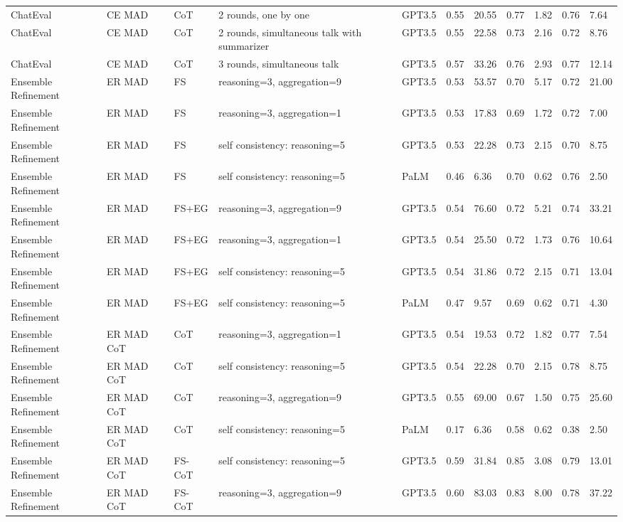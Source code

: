 \begin{landscape}
\begin{longtable}{lllllllllll}
ChatEval & CE MAD & CoT & 2 rounds, one by one & GPT3.5 & 0.55 & 20.55 & 0.77 & 1.82 & 0.76 & 7.64 \\
ChatEval & CE MAD & CoT & 2 rounds, simultaneous talk with summarizer & GPT3.5 & 0.55 & 22.58 & 0.73 & 2.16 & 0.72 & 8.76 \\
ChatEval & CE MAD & CoT & 3 rounds, simultaneous talk & GPT3.5 & 0.57 & 33.26 & 0.76 & 2.93 & 0.77 & 12.14 \\
Ensemble Refinement & ER MAD & FS & reasoning=3, aggregation=9 & GPT3.5 & 0.53 & 53.57 & 0.70 & 5.17 & 0.72 & 21.00 \\
Ensemble Refinement & ER MAD & FS & reasoning=3, aggregation=1 & GPT3.5 & 0.53 & 17.83 & 0.69 & 1.72 & 0.72 & 7.00 \\
Ensemble Refinement & ER MAD & FS & self consistency: reasoning=5 & GPT3.5 & 0.53 & 22.28 & 0.73 & 2.15 & 0.70 & 8.75 \\
Ensemble Refinement & ER MAD & FS & self consistency: reasoning=5 & PaLM & 0.46 & 6.36 & 0.70 & 0.62 & 0.76 & 2.50 \\
Ensemble Refinement & ER MAD & FS+EG & reasoning=3, aggregation=9 & GPT3.5 & 0.54 & 76.60 & 0.72 & 5.21 & 0.74 & 33.21 \\
Ensemble Refinement & ER MAD & FS+EG & reasoning=3, aggregation=1 & GPT3.5 & 0.54 & 25.50 & 0.72 & 1.73 & 0.76 & 10.64 \\
Ensemble Refinement & ER MAD & FS+EG & self consistency: reasoning=5 & GPT3.5 & 0.54 & 31.86 & 0.72 & 2.15 & 0.71 & 13.04 \\
Ensemble Refinement & ER MAD & FS+EG & self consistency: reasoning=5 & PaLM & 0.47 & 9.57 & 0.69 & 0.62 & 0.71 & 4.30 \\
Ensemble Refinement & ER MAD CoT & CoT & reasoning=3, aggregation=1 & GPT3.5 & 0.54 & 19.53 & 0.72 & 1.82 & 0.77 & 7.54 \\
Ensemble Refinement & ER MAD CoT & CoT & self consistency: reasoning=5 & GPT3.5 & 0.54 & 22.28 & 0.70 & 2.15 & 0.78 & 8.75 \\
Ensemble Refinement & ER MAD CoT & CoT & reasoning=3, aggregation=9 & GPT3.5 & 0.55 & 69.00 & 0.67 & 1.50 & 0.75 & 25.60 \\
Ensemble Refinement & ER MAD CoT & CoT & self consistency: reasoning=5 & PaLM & 0.17 & 6.36 & 0.58 & 0.62 & 0.38 & 2.50 \\
Ensemble Refinement & ER MAD CoT & FS-CoT & self consistency: reasoning=5 & GPT3.5 & 0.59 & 31.84 & 0.85 & 3.08 & 0.79 & 13.01 \\
Ensemble Refinement & ER MAD CoT & FS-CoT & reasoning=3, aggregation=9 & GPT3.5 & 0.60 & 83.03 & 0.83 & 8.00 & 0.78 & 37.22 \\

\end{longtable}
\end{landscape}
